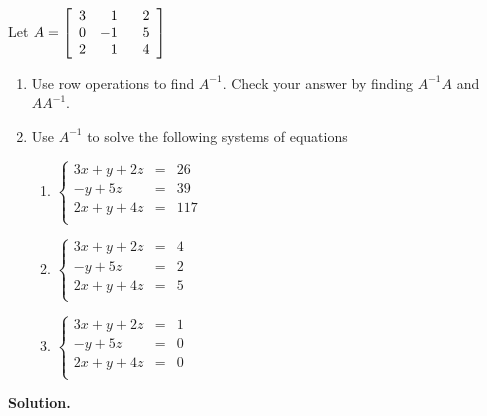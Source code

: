\documentclass{ximera}
\begin{document}
\begin{ex} \label{matrixinverseex} Let $A = \left[ \begin{array}{rrr} 3 & 1 & \hphantom{-}2 \\ 0 & -1 & 5 \\ 2 & 1 & 4 \\ \end{array} \right]$

\begin{enumerate}

\item  Use row operations to find $A^{-1}$.  Check your answer by finding $A^{-1}A$ and $AA^{-1}$.

\item  Use $A^{-1}$ to solve the following systems of equations

\begin{multicols}{3}

\begin{enumerate}

\item $\left\{ \begin{array}{rcl}   3x+y+2z & = & 26 \\-y+5z & = & 39 \\ 2x+y+4z&=& 117 \\ \end{array} \right.$

\item $\left\{ \begin{array}{rcl} 3x+y+2z & = & 4 \\-y+5z & = & 2 \\ 2x+y+4z&=& 5 \\ \end{array} \right.$

\item $\left\{ \begin{array}{rcl} 3x+y+2z & = & 1 \\-y+5z & = & 0 \\ 2x+y+4z&=& 0 \\ \end{array} \right.$

\end{enumerate}

\end{multicols}

\end{enumerate}

{\bf Solution.}  

\begin{enumerate}


\end{enumerate}
\end{ex}
\end{document}
